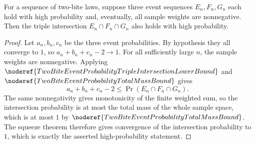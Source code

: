 \begin{helper}
For a sequence of two-bite laws, suppose three event sequences \(E_n,F_n,G_n\)
each hold with high probability and, eventually, all sample weights are
nonnegative.  Then the triple intersection \(E_n\cap F_n\cap G_n\) also holds
with high probability.
\end{helper}
\begin{proof}
Let \(a_n,b_n,c_n\) be the three event probabilities.  By hypothesis they all
converge to \(1\), so \(a_n+b_n+c_n-2\to1\).  For all sufficiently large \(n\),
the sample weights are nonnegative.  Applying
\(\noderef{TwoBiteEventProbabilityTripleIntersectionLowerBound}\) and
\(\noderef{TwoBiteEventProbabilityTotalMassBound}\) gives
\[
a_n+b_n+c_n-2\le \Pr(E_n\cap F_n\cap G_n).
\]
The same nonnegativity gives monotonicity of the finite weighted sum, so the
intersection probability is at most the total mass of the whole sample space,
which is at most \(1\) by
\(\noderef{TwoBiteEventProbabilityTotalMassBound}\).  The squeeze theorem
therefore gives convergence of the intersection probability to \(1\), which is
exactly the asserted high-probability statement.
\end{proof}
